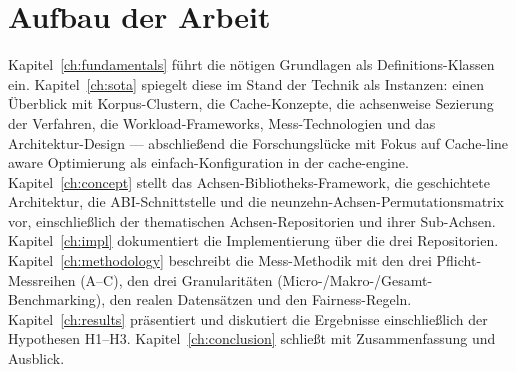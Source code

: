 \section{Aufbau der Arbeit}\label{sec:structure}
Kapitel~\ref{ch:fundamentals} führt die nötigen Grundlagen als Definitions-Klassen ein.
Kapitel~\ref{ch:sota} spiegelt diese im Stand der Technik als Instanzen: einen Überblick mit
Korpus-Clustern, die Cache-Konzepte, die achsenweise Sezierung der Verfahren, die
Workload-Frameworks, Mess-Technologien und das Architektur-Design --- abschließend die
Forschungslücke mit Fokus auf Cache-line aware Optimierung als einfach-Konfiguration in der
cache-engine. Kapitel~\ref{ch:concept} stellt das Achsen-Bibliotheks-Framework, die geschichtete
Architektur, die ABI-Schnittstelle und die neunzehn-Achsen-Permutationsmatrix vor, einschließlich
der thematischen Achsen-Repositorien und ihrer Sub-Achsen. Kapitel~\ref{ch:impl} dokumentiert die
Implementierung über die drei Repositorien. Kapitel~\ref{ch:methodology} beschreibt die
Mess-Methodik mit den drei Pflicht-Messreihen (A--C), den drei Granularitäten
(Micro-/Makro-/Gesamt-Benchmarking), den realen Datensätzen und den Fairness-Regeln.
Kapitel~\ref{ch:results} präsentiert und diskutiert die Ergebnisse einschließlich der Hypothesen
H1--H3. Kapitel~\ref{ch:conclusion} schließt mit Zusammenfassung und Ausblick.

